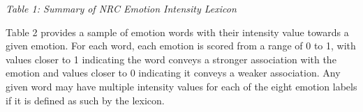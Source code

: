 \documentclass[journal]{./IEEE/IEEEtran}
\begin{document}
\begin{table}[h!]
    \centering
    \emph{Table 1: Summary of NRC Emotion Intensity Lexicon}
\end{table}

Table 2 provides a sample of emotion words with their intensity value towards a given emotion. For each word, each emotion is scored from a range of 0 to 1, with values closer to 1 indicating the word conveys a stronger association with the emotion and values closer to 0 indicating it conveys a weaker association. Any given word may have multiple intensity values for each of the eight emotion labels if it is defined as such by the lexicon.
\end{document}
